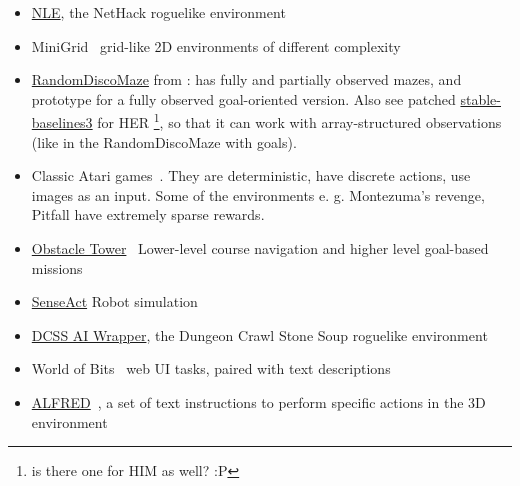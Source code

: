\documentclass[acmsmall, nonacm]{acmart}
\begin{document}
\begin{itemize}
  \item \href{https://github.com/facebookresearch/nle}{NLE}, the NetHack roguelike environment~\citep{kuttler_nethack_2020}

  \item MiniGrid~\citep{gym_minigrid} grid-like 2D environments of different complexity

  \item \href{https://github.com/ivannz/gymDiscoMaze.git@stable}{RandomDiscoMaze} from \citep[sec.~4.1]{badia_never_2020}: has fully and partially observed mazes, and prototype for a fully observed goal-oriented version.
  Also see patched \href{https://github.com/ivannz/stable-baselines3.git@her-multibinary-patch}{stable-baselines3} for HER%
  \footnote{
    is there one for HIM as well? :P
  }, so that it can work with array-structured observations (like in the RandomDiscoMaze with goals).

  \item Classic Atari games~\citep{Mnih2013PlayingAW}. They are deterministic, have discrete actions, use images as an input. Some of the environments e. g. Montezuma's revenge, Pitfall have extremely sparse rewards.
  
  \item \href{https://github.com/Unity-Technologies/obstacle-tower-env}{Obstacle Tower}~\citep{juliani_obstacle_2019} Lower-level course navigation and higher level goal-based missions
  
  \item \href{https://github.com/kindredresearch/SenseAct}{SenseAct} Robot simulation
  
  \item \href{https://github.com/dtdannen/dcss-ai-wrapper}{DCSS AI Wrapper}, the Dungeon Crawl Stone Soup roguelike environment
  
  \item World of Bits~\citep{Shi2017WorldOB} web UI tasks, paired with text descriptions
  
  \item \href{https://askforalfred.com/}{ALFRED}~\citep{ALFRED20}, a set of text instructions to perform specific actions in the 3D environment
\end{itemize}


\medskip



\end{document}
